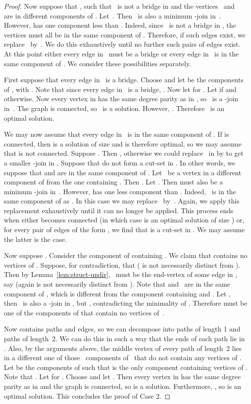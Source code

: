 \documentclass[11pt]{llncs}
\begin{document}
\begin{proof}
Now suppose that , such that~ is not a bridge in  and
the vertices~ and~ are in different components of .
Let~. Then~ is also a minimum
-join in~. However,  has one component less than .  Indeed,
since~ is not a bridge in , the vertices  must all be in
the same component of . Therefore, if such edges  exist, we
replace~ by~. We do this exhaustively until no further such pairs of
edges exist. At this point either every edge in~ must be a bridge or every
edge in~ is in the same component of . We consider these possibilities
separately.

First suppose that every edge in~ is a bridge. Choose  and let
 be the components of , with . Note that
since every edge in~ is a bridge, . Now let  for
. Let  if  and  otherwise. Now every vertex in 
has the same degree parity as in , so~ is a -join in~.  The
graph  is connected, so~ is a solution.  However,
.  Therefore~ is an optimal solution.

We may now assume that every edge in~ is in the same component of . If
 is connected, then  is a solution of size  and is therefore
optimal, so we may assume that  is not connected. Suppose . Then
, otherwise we could replace~ in  by  to get a
smaller -join in . Suppose that  do not form a cut-set in .
In other words, we suppose that  and  are in the same component of
. Let~ be a vertex in a different component of 
from the one containing . Then .  Let
. Then  must also be a minimum
-join in~. However,  has one less component than .
Indeed,~ is in the same component of  as . In this case we may
replace~ by~. Again, we apply this replacement exhaustively until it can
no longer be applied. This process ends when either  becomes connected (in
which case  is an optimal solution of size ) or, for every pair of
edges of the form , we find that  is a cut-set in
. We may assume the latter is the case.

Now suppose . Consider the component  of
 containing . We claim that  contains no vertices
of . Suppose, for contradiction, that  ( is not
necessarily distinct from ). Then by Lemma~\ref{lem:struct-undir},~ must
be the end-vertex of some edge in , say  (again  is
not necessarily distinct from ). Note that  and~ are in the same
component of , which is different from the component
containing  and . Let , then~
is also a -join in , but , contradicting the minimality of
. Therefore  must be one of the  components of  that contain no
vertices of~.

Now  contains  paths and  edges, so we can
decompose  into  paths of length 1 and 
paths of length~2. We can do this in such a way that the ends of each path lie
in .  Also, by the arguments above, the middle vertex of every path of length~2
lies in a different one of those~ components of~ that do not contain any
vertices of .  Let  be the components of  such that
 is the only component containing vertices of . Note that
.  Let  for .
Choose  and let . Then every vertex
in  has the same degree parity as in  and the graph  is
connected, so  is a solution. Furthermore, , so  is an optimal solution.  This concludes the proof of
Case 2.


\end{proof}
\end{document}
